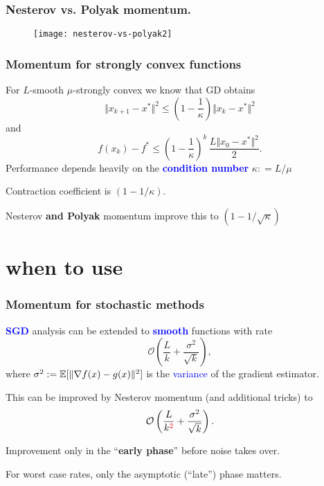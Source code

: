 \documentclass[aspectratio=149]{beamer}
\begin{document}
\begin{frame}
  \frametitle{Nesterov vs. Polyak momentum.}
  \vspace{-0.2cm}
  \begin{figure}[ht]
    \centering
    \texttt{[image: nesterov-vs-polyak2]}
  \end{figure}
\end{frame}

\begin{frame}
  \frametitle{Momentum for strongly convex functions}

  For $L$-smooth $\mu$-strongly convex we know that GD obtains
  \begin{equation}
    \Vert x_{k+1} - x^* \Vert^2 \le \left(1 - \frac{1}{\kappa}\right) \Vert x_k -x^* \Vert^2
  \end{equation}
  and
  \begin{equation}
    f(x_k)-f^* \le {\left(1-\frac{1}{\kappa}\right)}^k \, \frac{L \Vert x_0 -x^* \Vert^2}{2}.
  \end{equation}
  Performance depends heavily on the \textbf{\textcolor{blue}{condition number}} $\kappa : = L/\mu$
  \begin{block}{}
    \center
    Contraction coefficient is $(1-1/\kappa)$.
  \end{block}

  Nesterov \textbf{and Polyak} momentum improve this to $(1-1/\sqrt{\kappa})$
\end{frame}


\section{when to use}%
\label{sec:}

\begin{frame}
  \frametitle{Momentum for stochastic methods}
  \textbf{\textcolor{blue}{SGD}} analysis can be extended to \textbf{\textcolor{blue}{smooth}} functions with rate
  \begin{equation}
    \mathcal{O}\left(\frac{L}{k} + \frac{\sigma^2}{\sqrt{k}}\right),
  \end{equation}
  where $\sigma^2:= \mathbb{E} [ \Vert \nabla f(x) - g(x) \Vert^2 ]$ is the \textcolor{blue}{variance} of the gradient estimator.

  \medskip
  This can be improved by Nesterov momentum (and additional tricks) to
  \begin{equation}
    \mathcal{O}\left(\frac{L}{k^{\textcolor{red}{2}}} + \frac{\sigma^2}{\sqrt{k}}\right).
  \end{equation}

  Improvement only in the ``\textbf{early phase}'' before noise takes over.

  \begin{block}{}
    \centering
    For worst case rates, only the asymptotic (``late'') phase matters.
  \end{block}
\end{frame}
\end{document}
